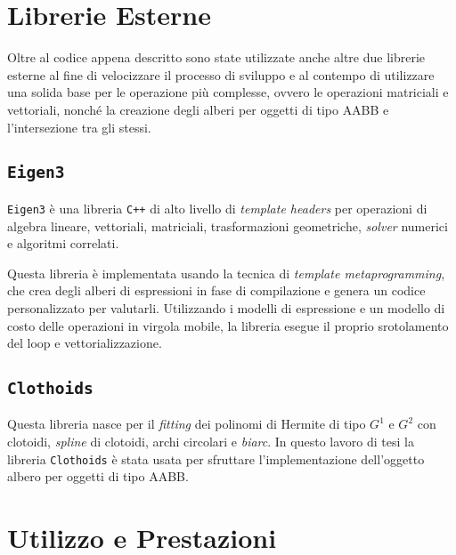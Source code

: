 \section{Librerie Esterne}
Oltre al codice appena descritto sono state utilizzate anche altre due librerie esterne al fine di velocizzare il processo di sviluppo e al contempo di utilizzare una solida base per le operazione più complesse, ovvero le operazioni matriciali e vettoriali, nonché la creazione degli alberi per oggetti di tipo \ac{AABB} e l'intersezione tra gli stessi.
%
\subsection{\texttt{Eigen3}}
\texttt{Eigen3} è una libreria \texttt{C++} di alto livello di \textit{template headers} per operazioni di algebra lineare, vettoriali, matriciali, trasformazioni geometriche, \textit{solver} numerici e algoritmi correlati.

Questa libreria è implementata usando la tecnica di \textit{template metaprogramming}, che crea degli alberi di espressioni in fase di compilazione e genera un codice personalizzato per valutarli. Utilizzando i modelli di espressione e un modello di costo delle operazioni in virgola mobile, la libreria esegue il proprio srotolamento del loop e vettorializzazione.
%
\subsection{\texttt{Clothoids}}
Questa libreria nasce per il \textit{fitting} dei polinomi di Hermite di tipo $G^1$ e $G^2$ con clotoidi, \textit{spline} di clotoidi, archi circolari e \textit{biarc}. In questo lavoro di tesi la libreria \texttt{Clothoids} è stata usata per sfruttare l'implementazione dell'oggetto albero per oggetti di tipo \ac{AABB}.
%
\section{Utilizzo e Prestazioni}

